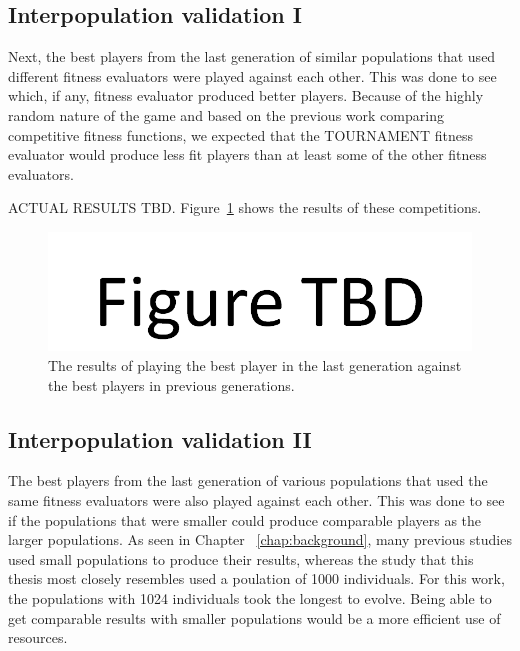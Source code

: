 \subsection{Interpopulation validation I}

Next, the best players from the last generation of similar populations that used
different fitness evaluators were played against each other. This was done to
see which, if any, fitness evaluator produced better players. Because of the
highly random nature of the game and based on the previous work comparing
competitive fitness functions, we expected that the TOURNAMENT fitness evaluator
would produce less fit players than at least some of the other fitness
evaluators.

ACTUAL RESULTS TBD. Figure~\ref{figure-interpopulation1} shows the results of
these competitions.

\begin{figure}[htp]
\centerline{\includegraphics[width=1.0\columnwidth]{Figures/figureTBD.png}}
\caption[Validation - Comparing Fitness Evaluators]{The results of playing the
best player in the last generation against the best players in previous generations.}
\label{figure-interpopulation1}
\end{figure}

\subsection{Interpopulation validation II}

The best players from the last generation of various populations that used
the same fitness evaluators were also played against each other. This was done
to see if the populations that were smaller could produce comparable
players as the larger populations. As seen in Chapter ~\ref{chap:background},
many previous studies used small populations to produce their results, whereas
the study that this thesis most closely resembles used a poulation of 1000
individuals. For this work, the populations with 1024 individuals took the
longest to evolve. Being able to get comparable results with smaller populations
would be a more efficient use of resources.

